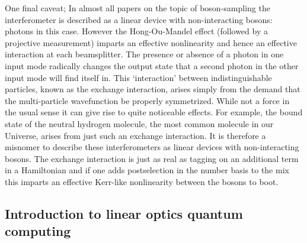 \documentclass[aps,pra,twocolumn,amsmath,amssymb,nofootinbib,superscriptaddress]{revtex4}
\begin{document}
One final caveat; In almost all papers on the topic of boson-sampling the interferometer is described as a linear device with non-interacting bosons: photons in this case. However the Hong-Ou-Mandel effect (followed by a projective measurement) imparts an effective nonlinearity and hence an effective interaction at each beamsplitter. The presence or absence of a photon in one input mode radically changes the output state that a second photon in the other input mode will find itself in. This `interaction' between indistinguishable particles, known as the exchange interaction, arises simply from the demand that the multi-particle wavefunction be properly symmetrized. While not a force in the usual sense it can give rise to quite noticeable effects. For example, the bound state of the neutral hydrogen molecule, the most common molecule in our Universe, arises from just such an exchange interaction. It is therefore a misnomer to describe these interferometers as linear devices with non-interacting bosons. The exchange interaction is just as real as tagging on an additional term in a Hamiltonian and if one adds postselection in the number basis to the mix this imparts an effective Kerr-like nonlinearity between the bosons to boot.   

\subsection{Introduction to linear optics quantum computing}
 
\end{document}
